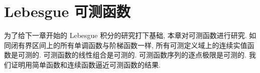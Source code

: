 \documentclass[../main.tex]{subfiles}
\begin{document}
\chapter{Lebesgue 可测函数}\label{chapter:ch03-可测函数}

为了给下一章开始的 Lebesgue 积分的研究打下基础, 本章对可测函数进行研究. 如同闭有界区间上的所有单调函数与阶梯函数一样, 所有可测定义域上的连续实值函数是可测的. 可测函数的线性组合是可测的. 可测函数序列的逐点极限是可测的. 我们证明用简单函数和连续函数逼近可测函数的结果.






\end{document}
